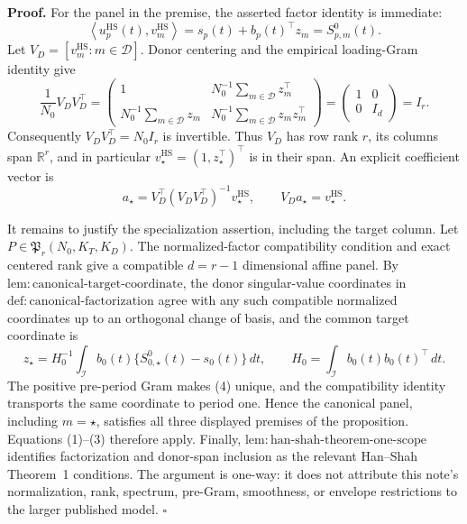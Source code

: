 \textbf{Proof.}
For the panel in the premise, the asserted factor identity is immediate:
\[
 \left\langle u_p^{\mathrm{HS}}(t),v_m^{\mathrm{HS}}\right\rangle
 =s_p(t)+b_p(t)^\top z_m=S^0_{p,m}(t).                 \tag{1}
\]
Let \(V_D=[v_m^{\mathrm{HS}}:m\in\mathcal D]\).  Donor centering and
the empirical loading-Gram identity give
\[
 \frac1{N_0}V_DV_D^\top
 =\begin{pmatrix}
 1 & N_0^{-1}\sum_{m\in\mathcal D}z_m^\top\\
 N_0^{-1}\sum_{m\in\mathcal D}z_m &
 N_0^{-1}\sum_{m\in\mathcal D}z_mz_m^\top
 \end{pmatrix}
 =\begin{pmatrix}1&0\\0&I_d\end{pmatrix}=I_r.        \tag{2}
\]
Consequently \(V_DV_D^\top=N_0I_r\) is invertible.  Thus \(V_D\) has
row rank \(r\), its columns span \(\mathbb R^r\), and in particular
\(v_\star^{\mathrm{HS}}=(1,z_\star^\top)^\top\) is in their span.  An
explicit coefficient vector is
\[
 a_\star
 =V_D^\top(V_DV_D^\top)^{-1}v_\star^{\mathrm{HS}},
 \qquad
 V_Da_\star=v_\star^{\mathrm{HS}}.                    \tag{3}
\]

It remains to justify the specialization assertion, including the target
column.  Let \(P\in\mathfrak P_r(N_0,K_T,K_D)\).  The normalized-factor
compatibility condition and exact centered rank give a compatible
\(d=r-1\) dimensional affine panel.  By
\(\mathrm{lem:canonical\mbox{-}target\mbox{-}coordinate}\), the donor
singular-value coordinates in
\(\mathrm{def:canonical\mbox{-}factorization}\) agree with any such
compatible normalized coordinates up to an orthogonal change of basis,
and the common target coordinate is
\[
 z_\star
 =H_0^{-1}\int_{\mathcal I}b_0(t)
       \{S^0_{0,\star}(t)-s_0(t)\}\,dt,
 \qquad
 H_0=\int_{\mathcal I}b_0(t)b_0(t)^\top\,dt.          \tag{4}
\]
The positive pre-period Gram makes (4) unique, and the compatibility
identity transports the same coordinate to period one.  Hence the
canonical panel, including \(m=\star\), satisfies all three displayed
premises of the proposition.  Equations (1)--(3) therefore apply.
Finally,
\(\mathrm{lem:han\mbox{-}shah\mbox{-}theorem\mbox{-}one\mbox{-}scope}\)
identifies factorization and donor-span inclusion as the relevant
Han--Shah Theorem~1 conditions.  The argument is one-way: it does not
attribute this note's normalization, rank, spectrum, pre-Gram,
smoothness, or envelope restrictions to the larger published model.
\(\square\)